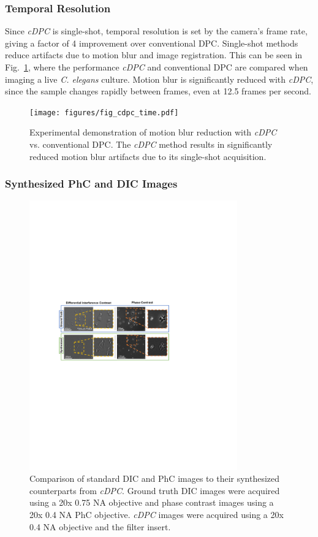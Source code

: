 \subsubsection{Temporal Resolution}
Since \textit{cDPC} is single-shot, temporal resolution is set by the camera's frame rate, giving a factor of 4 improvement over conventional DPC. Single-shot methods reduce artifacts due to motion blur and image registration. This can be seen in Fig.~\ref{fig:temporalRes}, where the performance \textit{cDPC} and conventional DPC are compared when imaging a live \textit{C. elegans} culture. Motion blur is significantly reduced with \textit{cDPC}, since the sample changes rapidly between frames, even at 12.5 frames per second.

\begin{figure}[tbh]
\centering
\texttt{[image: figures/fig\_cdpc\_time.pdf]}
\caption{\label{fig:temporalRes}
Experimental demonstration of motion blur reduction with \textit{cDPC} vs. conventional DPC. The \textit{cDPC} method results in significantly reduced motion blur artifacts due to its single-shot acquisition.}
\end{figure}

\subsubsection{Synthesized PhC and DIC Images}

\begin{figure}[tbh]
\centering
\includegraphics[width=0.8\textwidth]{figures/fig_cdpc_dic.pdf}
\caption{\label{fig:synthDIC_PC}
Comparison of standard DIC and PhC images to their synthesized counterparts from \textit{cDPC}. Ground truth DIC images were acquired using a 20x 0.75 NA objective and phase contrast images using a 20x 0.4 NA PhC objective. \textit{cDPC} images were acquired using a 20x 0.4 NA objective and the filter insert.}\end{figure}

